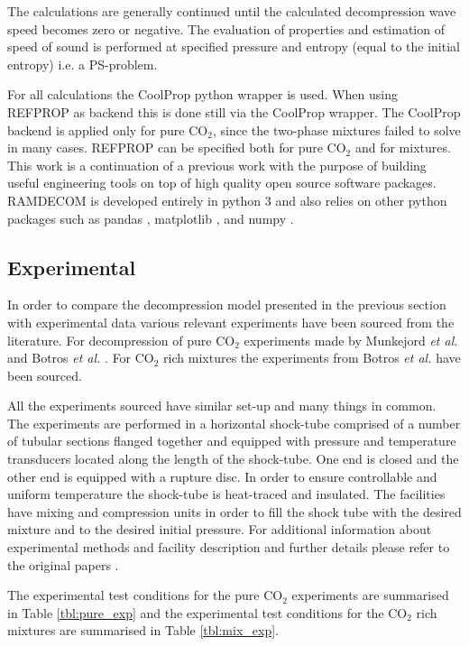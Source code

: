 \documentclass[a4paper, 10pt, twocolumn, twoside]{scrartcl}
\begin{document}
The calculations are generally continued until the calculated decompression wave speed becomes zero or negative. The evaluation of properties and estimation of speed of sound is performed at specified pressure and entropy (equal to the initial entropy) i.e. a PS-problem. 

For all calculations the CoolProp python wrapper is used. When using REFPROP as backend this is done still via the CoolProp wrapper. The CoolProp backend is applied only for pure CO$_2$, since the two-phase mixtures failed to solve in many cases. REFPROP can be specified both for pure CO$_2$ and for mixtures. This work is a continuation of a previous work \cite{Andreasen2021} with the purpose of building useful engineering tools on top of high quality open source software packages. RAMDECOM is developed entirely in python 3 and also relies on other python packages such as pandas \cite{mckinney-proc-scipy-2010}, matplotlib \cite{Hunter:2007}, and numpy \cite{harris2020array}. 



\subsection{Experimental}
In order to compare the decompression model presented in the previous section with experimental data various relevant experiments have been sourced from the literature. For decompression of pure CO$_2$ experiments made by Munkejord \emph{et al.} \cite{MUNKEJORD2020118560} and Botros \emph{et al.} \cite{Botros_pure}. For CO$_2$ rich mixtures the experiments from Botros \emph{et al.} \cite{Botros_mixture} have been sourced. 

All the experiments sourced have similar set-up and many things in common. The experiments are performed in a horizontal shock-tube comprised of a number of tubular sections flanged together and equipped with pressure and temperature transducers located along the length of the shock-tube. One end is closed and the other end is equipped with a rupture disc. In order to ensure controllable and uniform temperature the shock-tube is heat-traced and insulated. The facilities have mixing and compression units in order to fill the shock tube with the desired mixture and to the desired initial pressure. For additional information about experimental methods and facility description and further details please refer to the original papers \cite{MUNKEJORD2020118560,Botros_pure}.

The experimental test conditions for the pure CO$_2$ experiments are summarised in Table \ref{tbl:pure_exp} and the experimental test conditions for the CO$_2$ rich mixtures are summarised in Table \ref{tbl:mix_exp}.
\end{document}
